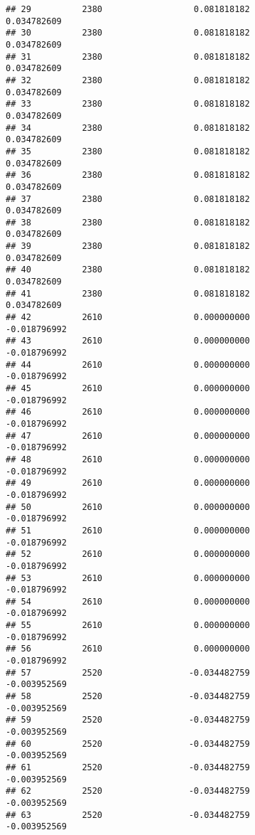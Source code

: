 \documentclass[]{article}
\begin{document}
\begin{verbatim}
## 29          2380                  0.081818182                0.034782609
## 30          2380                  0.081818182                0.034782609
## 31          2380                  0.081818182                0.034782609
## 32          2380                  0.081818182                0.034782609
## 33          2380                  0.081818182                0.034782609
## 34          2380                  0.081818182                0.034782609
## 35          2380                  0.081818182                0.034782609
## 36          2380                  0.081818182                0.034782609
## 37          2380                  0.081818182                0.034782609
## 38          2380                  0.081818182                0.034782609
## 39          2380                  0.081818182                0.034782609
## 40          2380                  0.081818182                0.034782609
## 41          2380                  0.081818182                0.034782609
## 42          2610                  0.000000000               -0.018796992
## 43          2610                  0.000000000               -0.018796992
## 44          2610                  0.000000000               -0.018796992
## 45          2610                  0.000000000               -0.018796992
## 46          2610                  0.000000000               -0.018796992
## 47          2610                  0.000000000               -0.018796992
## 48          2610                  0.000000000               -0.018796992
## 49          2610                  0.000000000               -0.018796992
## 50          2610                  0.000000000               -0.018796992
## 51          2610                  0.000000000               -0.018796992
## 52          2610                  0.000000000               -0.018796992
## 53          2610                  0.000000000               -0.018796992
## 54          2610                  0.000000000               -0.018796992
## 55          2610                  0.000000000               -0.018796992
## 56          2610                  0.000000000               -0.018796992
## 57          2520                 -0.034482759               -0.003952569
## 58          2520                 -0.034482759               -0.003952569
## 59          2520                 -0.034482759               -0.003952569
## 60          2520                 -0.034482759               -0.003952569
## 61          2520                 -0.034482759               -0.003952569
## 62          2520                 -0.034482759               -0.003952569
## 63          2520                 -0.034482759               -0.003952569

\end{verbatim}
\end{document}
